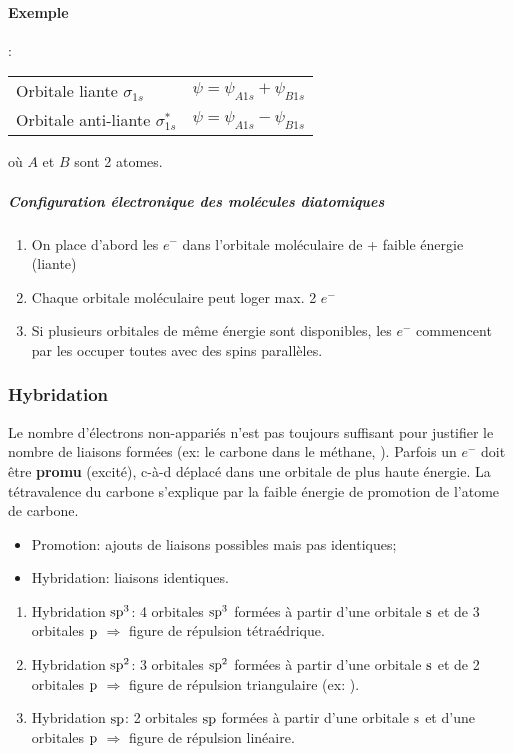 \paragraph{Exemple}
:
\begin{center}
	\begin{tabular}{ll}
		Orbitale liante $\sigma_{1s}$ & $\psi=\psi_{A1s}+\psi_{B1s}$\\
		Orbitale anti-liante $\sigma^{*}_{1s}$ & $\psi=\psi_{A1s}-\psi_{B1s}$
	\end{tabular}
\end{center}
où $A$ et $B$ sont 2 atomes.

\subparagraph{Configuration électronique des molécules diatomiques}
\begin{enumerate}
	\item On place d'abord les $e^-$ dans l'orbitale moléculaire de + faible énergie (liante)
	\item Chaque orbitale moléculaire peut loger max. 2 $e^-$
	\item Si plusieurs orbitales de même énergie sont disponibles, les $e^-$ commencent par les occuper toutes avec des spins parallèles.
\end{enumerate}

\subsubsection{Hybridation}

Le nombre d'électrons non-appariés n'est pas toujours suffisant pour justifier le nombre de liaisons formées (ex: le carbone dans le méthane, ).
Parfois un $e^-$ doit être \textbf{promu} (excité), c-à-d déplacé dans une orbitale de plus haute énergie.
La tétravalence du carbone s'explique par la faible énergie de promotion de l'atome de carbone.
\begin{itemize}
	\item Promotion: ajouts de liaisons possibles mais pas identiques;
	\item Hybridation: liaisons identiques.
\end{itemize}
\begin{enumerate}
	\item Hybridation $\mathrm{s}\mathrm{p}^3$: 4 orbitales $\mathrm{s}\mathrm{p}^3$ formées à partir d'une orbitale $\mathrm{s}$ et de 3 orbitales $\mathrm{p}$ $\Rightarrow$ figure de répulsion tétraédrique.
	\item Hybridation $\mathrm{s}\mathrm{p}^2$: 3 orbitales $\mathrm{s}\mathrm{p}^2$ formées à partir d'une orbitale $\mathrm{s}$ et de 2 orbitales $\mathrm{p}$ $\Rightarrow$ figure de répulsion triangulaire (ex: ).
	\item Hybridation $\mathrm{s}\mathrm{p}$: 2 orbitales $\mathrm{s}\mathrm{p}$ formées à partir d'une orbitale $\mathrm{s}$ et d'une orbitales $\mathrm{p}$ $\Rightarrow$ figure de répulsion linéaire.
\end{enumerate}


